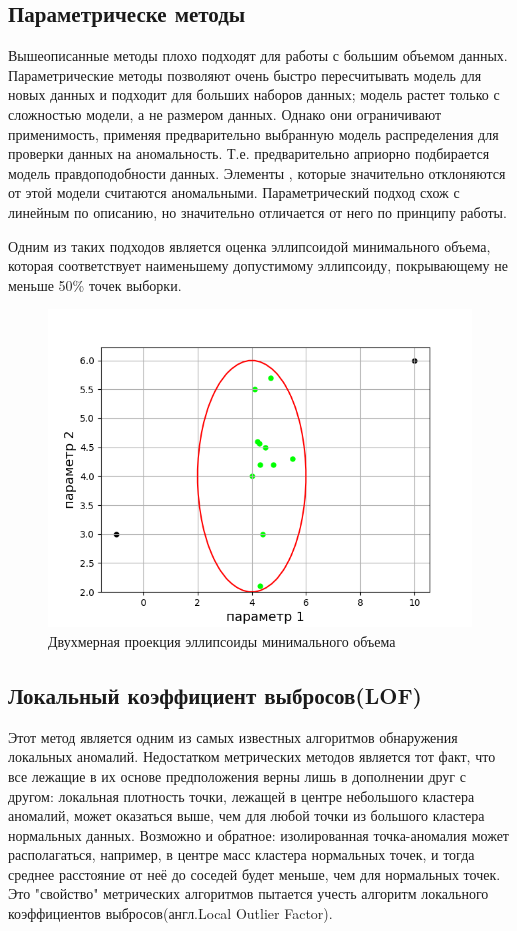 \subsection{Параметрическе методы}
Вышеописанные методы плохо подходят для работы с большим объемом данных.
Параметрические методы позволяют очень быстро пересчитывать модель для
новых данных и подходит для больших наборов данных; модель растет
только с сложностью модели, а не размером данных. Однако они ограничивают
применимость,  применяя предварительно выбранную модель распределения для проверки данных на аномальность. Т.е. предварительно априорно подбирается модель правдоподобности данных. Элементы , которые значительно отклоняются от этой модели считаются аномальными. Параметрический подход схож с линейным по описанию, но значительно отличается от него по принципу работы.

Одним из таких подходов является оценка эллипсоидой минимального объема\cite{Book11}, которая соответствует наименьшему допустимому эллипсоиду, покрывающему не меньше 50\% точек выборки.
\begin{figure}
	\centering
	\includegraphics[width=.5\textwidth]{img/4.png}
	\caption{Двухмерная проекция эллипсоиды минимального объема}
	\label{fig04}
\end{figure}
\subsection{Локальный коэффициент выбросов(LOF)}
Этот метод является одним из самых известных алгоритмов обнаружения локальных аномалий. Недостатком метрических методов является тот факт, что все лежащие в их основе предположения верны лишь в дополнении друг с другом: локальная плотность точки, лежащей в центре небольшого кластера аномалий, может оказаться выше, чем для любой точки из большого кластера
нормальных данных. Возможно и обратное: изолированная точка-аномалия может располагаться, например, в центре масс кластера нормальных точек, и тогда среднее расстояние от неё до соседей будет меньше, чем для нормальных точек. Это "свойство" метрических алгоритмов пытается учесть алгоритм  локального коэффициентов выбросов(англ.Local Outlier Factor).

